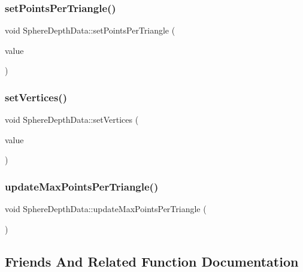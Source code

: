 \subsubsection{\texorpdfstring{set\+Points\+Per\+Triangle()}{setPointsPerTriangle()}}
{\footnotesize\ttfamily void Sphere\+Depth\+Data\+::set\+Points\+Per\+Triangle (\begin{DoxyParamCaption}\item[{const std\+::vector$<$ std\+::list$<$ Q\+Vector3D $>$ $>$ \&}]{value }\end{DoxyParamCaption})}

\mbox{\label{struct_sphere_depth_data_a95e070bea3d8ec4a0449044e4616208f}} 
\subsubsection{\texorpdfstring{set\+Vertices()}{setVertices()}}
{\footnotesize\ttfamily void Sphere\+Depth\+Data\+::set\+Vertices (\begin{DoxyParamCaption}\item[{std\+::vector$<$ float $>$}]{value }\end{DoxyParamCaption})}

\mbox{\label{struct_sphere_depth_data_a4cf92f63341fd72e6659dcd1501eb2ac}} 
\subsubsection{\texorpdfstring{update\+Max\+Points\+Per\+Triangle()}{updateMaxPointsPerTriangle()}}
{\footnotesize\ttfamily void Sphere\+Depth\+Data\+::update\+Max\+Points\+Per\+Triangle (\begin{DoxyParamCaption}{ }\end{DoxyParamCaption})\hspace{0.3cm}{\ttfamily [private]}}



\subsection{Friends And Related Function Documentation}
\mbox{\label{struct_sphere_depth_data_a85dbb35e50f4a9c4a1d0f0c783959bdb}} 
